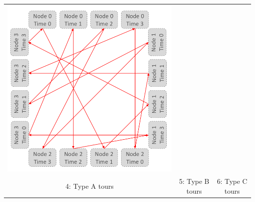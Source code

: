 \documentclass[11pt]{article}
\begin{document}
\begin{table}[H]
{\begin{tabular}{ccc}
			\includegraphics[scale=0.2]{figures/salesman-penalties6.png} \\
			
			4: Type A tours & 5: Type B tours & 6: Type C tours \\
			

\end{tabular}}
\end{table}
\end{document}
